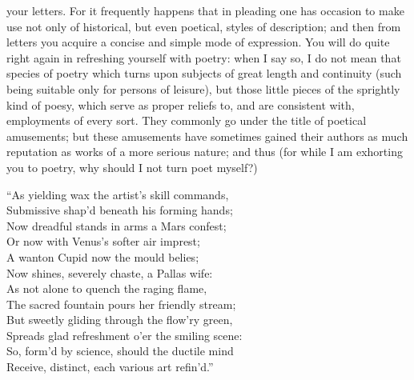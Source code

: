 your letters. For it frequently happens that in pleading one has occasion
to make use not only of historical, but even poetical, styles of
description; and then from letters you acquire a concise and simple mode
of expression. You will do quite right again in refreshing yourself with
poetry: when I say so, I do not mean that species of poetry which turns
upon subjects of great length and continuity (such being suitable only for
persons of leisure), but those little pieces of the sprightly kind of
poesy, which serve as proper reliefs to, and are consistent with,
employments of every sort. They commonly go under the title of poetical
amusements; but these amusements have sometimes gained their authors as
much reputation as works of a more serious nature; and thus (for while I
am exhorting you to poetry, why should I not turn poet myself?)

``As yielding wax the artist's skill commands,\\
Submissive shap'd beneath his forming hands;\\
Now dreadful stands in arms a Mars confest;\\
Or now with Venus's softer air imprest;\\
A wanton Cupid now the mould belies;\\
Now shines, severely chaste, a Pallas wife:\\
As not alone to quench the raging flame,\\
The sacred fountain pours her friendly stream;\\
But sweetly gliding through the flow'ry green,\\
Spreads glad refreshment o'er the smiling scene:\\
So, form'd by science, should the ductile mind\\
Receive, distinct, each various art refin'd.''

